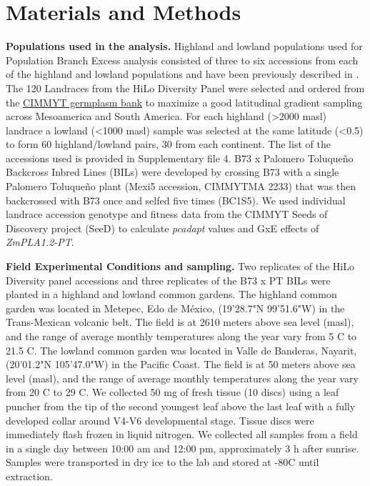 \documentclass[9pt,twocolumn,twoside,lineno]{BioRxiv}
\begin{document}
\section{Materials and Methods}
\label{sec:materials:methods}
\textbf{Populations used in the analysis.} 
Highland and lowland populations used for Population Branch Excess analysis consisted of three to six accessions from each of the highland and lowland populations and have been previously described in \cite{Wang2020-mp, Wang2017-bc}. 
The 120 Landraces from the HiLo Diversity Panel were selected and ordered from the \href{http://mgb.cimmyt.org/gringlobal/search.aspx}{CIMMYT germplasm bank} to maximize a good latitudinal gradient sampling across Mesoamerica and South America. For each highland  (>2000 masl) landrace a lowland (<1000 masl) sample was selected at the same latitude (<0.5\degree) to form 60 highland/lowland pairs, 30 from each continent. 
The list of the accessions used is provided in Supplementary file 4.   
B73 x Palomero Toluqueño Backcross Inbred Lines (BILs) were developed by crossing B73 with a single Palomero Toluqueño plant (Mexi5 accession, CIMMYTMA 2233) that was then backcrossed with B73 once and selfed five times (BC1S5).  
We used  individual landrace accession genotype and fitness data from the CIMMYT Seeds of Discovery project (SeeD) \cite{Gates2019-xu} to calculate \textit{pcadapt} \cite{Luu2017-ws} values and GxE effects of \textit{ZmPLA1.2-PT}.

\textbf{Field Experimental Conditions and sampling.} 
Two replicates of the HiLo Diversity panel accessions and three replicates of the B73 x PT BILs were planted in a highland and lowland common gardens. 
The highland common garden was located in Metepec, Edo de México, (19'28.7"N 99'51.6"W) in the Trans-Mexican volcanic belt. 
The field is at 2610 meters above sea level (masl), and the range of average monthly temperatures along the year vary from 5 \degree C to 21.5 \degree C.  
The lowland common garden was located in Valle de Banderas, Nayarit, (20'01.2"N 105'47.0"W) in the Pacific Coast. 
The field is at 50 meters above sea level (masl), and the range of average monthly temperatures along the year vary from 20 \degree C to 29 \degree C.
We collected 50 mg of fresh tissue (10 discs) using a leaf puncher from the tip of the second youngest leaf above the last leaf with a fully developed collar around V4-V6 developmental stage. 
Tissue discs were immediately flash frozen in liquid nitrogen. 
We collected all samples from a field in a single day between 10:00 am and 12:00 pm, approximately 3 h after sunrise. Samples were transported in dry ice to the lab and stored at -80\degree C until extraction. 
\end{document}
